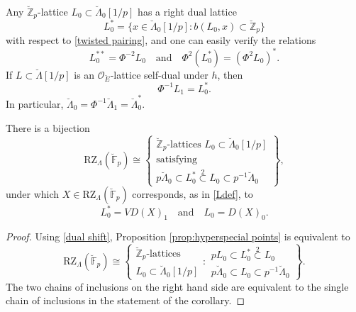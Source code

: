 \documentclass[11pt]{alggeom}
\newcommand{\iso}{\cong}
\newcommand{\Z}{\mathbb Z}
\newcommand{\F}{\mathbb F}
\newcommand{\co}{\mathcal O}
\begin{document}
 Any $\breve{\Z}_p$-lattice  $L_0 \subset \breve{\Lambda}_0[1/p]$ has a right dual lattice
\begin{equation}\label{right dual}
L_0^* = \{ x \in  \breve{\Lambda}_0[1/p] :  b(   L_0, x ) \subset \breve{\Z}_p \}
\end{equation}
with respect to \eqref{twisted pairing}, and one can easily verify the relations  
\begin{equation}\label{twisted dual properties}
L_0^{**} = \Phi^{-2} L_0 \quad \mbox{and}\quad \Phi^2(L_0^*) = (\Phi^2 L_0)^*.
\end{equation}
If $L \subset \breve{\Lambda}[1/p]$ is an $\co_{\breve{E}}$-lattice self-dual under $h$, then 
\begin{equation}\label{dual shift}
\Phi^{-1} L_1 = L_0^* .
\end{equation}
In particular, 
$
\breve{\Lambda}_0 = \Phi^{-1} \breve{\Lambda}_1 = \breve{\Lambda}_0^*.
$


\begin{corollary}\label{cor:half hyperspecial}
There is a bijection
\[
\mathrm{RZ}_\Lambda( \breve{\F}_p) 
\iso
\left\{
\begin{array}{c}  \breve{\Z}_p\mbox{-lattices }     L_0  \subset  \breve{\Lambda}_0[1/p]    \\
\mbox{satisfying} \\
  p  \breve{\Lambda}_0  \subset L_0^* \stackrel{2}{\subset} L_0  \subset p^{-1} \breve{\Lambda}_0  
\end{array}
\right\} ,
\]
under which  $X \in \mathrm{RZ}_\Lambda( \breve{\F}_p)$ corresponds, as in \eqref{Ldef}, to
\[
L_0^*  = VD(X)_1  \quad \mbox{and} \quad 
L_0    = D(X)_0   .
\]
\end{corollary}

\begin{proof}
Using  \eqref{dual shift},   Proposition \ref{prop:hyperspecial points} is equivalent to 
\[
\mathrm{RZ}_\Lambda( \breve{\F}_p) 
\iso
\left\{
\begin{array}{c}  \breve{\Z}_p\mbox{-lattices }   \\  L_0  \subset  \breve{\Lambda}_0[1/p]  \end{array} : 
\begin{array}{c}
pL_0 \subset L_0^* \stackrel{2}{\subset} L_0\\
  p  \breve{\Lambda}_0  \subset  L_0  \subset p^{-1} \breve{\Lambda}_0 
  \end{array}  \right\} .
\]
The two chains of inclusions on the right hand side are equivalent to the single chain of inclusions in the statement of the corollary.
\end{proof}
\end{document}

